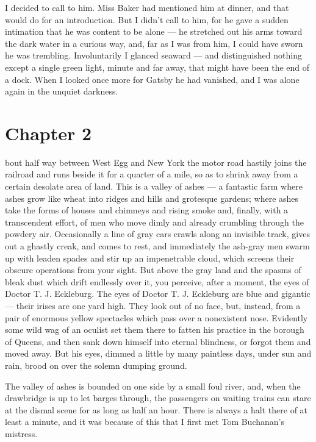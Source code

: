\documentclass{znotebook}
\begin{document}
I decided to call to him. Miss Baker had mentioned him at dinner, and that would do for an introduction. But I didn't call to him, for he gave a sudden intimation that he was content to be alone ---{} he stretched out his arms toward the dark water in a curious way, and, far as I was from him, I could have sworn he was trembling. Involuntarily I glanced seaward ---{} and distinguished nothing except a single green light, minute and far away, that might have been the end of a dock. When I looked once more for Gatsby he had vanished, and I was alone again in the unquiet darkness.

\chapter{Chapter 2}

\lettrine[findent=2pt]{}{ }bout half way between West Egg and New York the motor road hastily joins the railroad and runs beside it for a quarter of a mile, so as to shrink away from a certain desolate area of land. This is a valley of ashes ---{} a fantastic farm where ashes grow like wheat into ridges and hills and grotesque gardens; where ashes take the forms of houses and chimneys and rising smoke and, finally, with a transcendent effort, of men who move dimly and already crumbling through the powdery air. Occasionally a line of gray cars crawls along an invisible track, gives out a ghastly creak, and comes to rest, and immediately the ash-gray men swarm up with leaden spades and stir up an impenetrable cloud, which screens their obscure operations from your sight. But above the gray land and the spasms of bleak dust which drift endlessly over it, you perceive, after a moment, the eyes of Doctor T. J. Eckleburg. The eyes of Doctor T. J. Eckleburg are blue and gigantic ---{} their irises are one yard high. They look out of no face, but, instead, from a pair of enormous yellow spectacles which pass over a nonexistent nose. Evidently some wild wag of an oculist set them there to fatten his practice in the borough of Queens, and then sank down himself into eternal blindness, or forgot them and moved away. But his eyes, dimmed a little by many paintless days, under sun and rain, brood on over the solemn dumping ground.

The valley of ashes is bounded on one side by a small foul river, and, when the drawbridge is up to let barges through, the passengers on waiting trains can stare at the dismal scene for as long as half an hour. There is always a halt there of at least a minute, and it was because of this that I first met Tom Buchanan's mistress.
\end{document}

